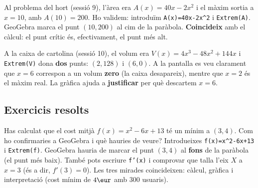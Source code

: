 \begin{exemple}
Al problema del hort (sessió 9), l'àrea era $A(x)=40x-2x^2$ i el màxim sortia a $x=10$,
amb $A(10)=200$. Ho validem: introduïm \texttt{A(x)=40x-2x\^{}2} i \texttt{Extrem(A)}.
GeoGebra marca el punt $(10,200)$ al cim de la paràbola. \textbf{Coincideix} amb el
càlcul: el punt crític és, efectivament, el punt més alt.
\begin{center}

\end{center}
\end{exemple}

\begin{exemple}
A la caixa de cartolina (sessió 10), el volum era $V(x)=4x^3-48x^2+144x$ i
\texttt{Extrem(V)} dona \textbf{dos} punts: $(2,128)$ i $(6,0)$. A la pantalla es veu
clarament que $x=6$ correspon a un volum \textbf{zero} (la caixa desapareix), mentre que
$x=2$ és el màxim real. La gràfica ajuda a \textbf{justificar} per què descartem $x=6$.
\end{exemple}

\subsection{Exercicis resolts}

\begin{exresolt}
Has calculat que el cost mitjà $f(x)=x^2-6x+13$ té un mínim a $(3,4)$. Com ho
confirmaries a GeoGebra i què hauries de veure?
\solucio
Introdueixes \texttt{f(x)=x\^{}2-6x+13} i \texttt{Extrem(f)}. GeoGebra hauria de marcar
el punt $(3,4)$ al \textbf{fons} de la paràbola (el punt més baix). També pots escriure
\texttt{f'(x)} i comprovar que talla l'eix $X$ a $x=3$ (és a dir, $f'(3)=0$). Les tres
mirades coincideixen: càlcul, gràfica i interpretació (cost mínim de $4\eur$ amb $300$
usuaris).
\end{exresolt}

